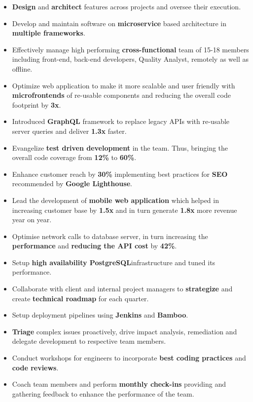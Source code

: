 \documentclass[10pt,a4paper,ragged2e,withhyper]{altacv}
\begin{document}
\begin{paracol}{2}
\begin{itemize}
\item \textbf{Design} and \textbf{architect} features across projects and oversee their execution.
\item Develop and maintain software on \textbf{microservice} based architecture in \textbf{multiple frameworks}.
\item Effectively manage high performing \textbf{cross-functional} team of 15-18 members including front-end, back-end developers, Quality Analyst, remotely as well as offline.
\item Optimize web application to make it more scalable and user friendly with \textbf{microfrontends} of re-usable components and reducing the overall code footprint by \textbf{3x}.
\item Introduced \textbf{GraphQL} framework to replace legacy APIs with re-usable server queries and deliver \textbf{1.3x} faster.
\item Evangelize \textbf{test driven development} in the team. Thus, bringing the overall code coverage from \textbf{12\%} to \textbf{60\%}.
\item Enhance customer reach by \textbf{30\%} implementing best practices for \textbf{SEO} recommended by \textbf{Google Lighthouse}.
\item Lead the development of \textbf{mobile web application} which helped in increasing customer base by \textbf{1.5x} and in turn generate \textbf{1.8x} more revenue year on year.
\item Optimise network calls to database server, in turn increasing the \textbf{performance} and \textbf{reducing the API cost} by \textbf{42\%}.
\item Setup \textbf{high availability PostgreSQL}infrastructure and tuned its performance.
\item Collaborate with client and internal project managers to \textbf{strategize} and create \textbf{technical roadmap} for each quarter.
\item Setup deployment pipelines using \textbf{Jenkins} and \textbf{Bamboo}.
\item \textbf{Triage} complex issues proactively, drive impact analysis, remediation and delegate development to respective team members.
\item Conduct workshops for engineers to incorporate \textbf{best coding practices} and \textbf{code reviews}.
\item Coach team members and perform \textbf{monthly check-ins} providing and gathering feedback to enhance the performance of the team.
\end{itemize}


\end{paracol}
\end{document}
